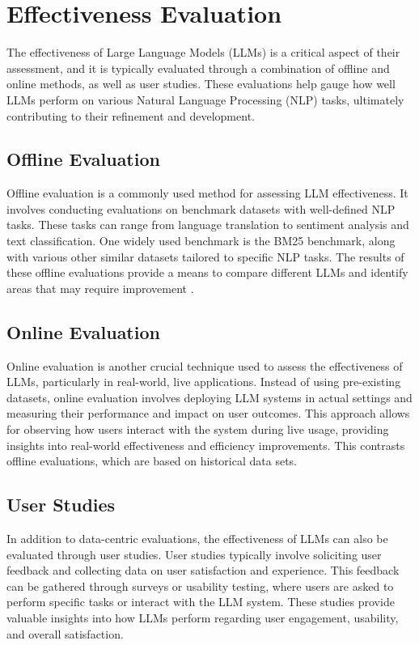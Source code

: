 \section{Effectiveness Evaluation}
The effectiveness of Large Language Models (LLMs) is a critical aspect of their assessment, and it is typically evaluated through a combination of offline and online methods, as well as user studies. These evaluations help gauge how well LLMs perform on various Natural Language Processing (NLP) tasks, ultimately contributing to their refinement and development.

\subsection{Offline Evaluation}
Offline evaluation is a commonly used method for assessing LLM effectiveness. It involves conducting evaluations on benchmark datasets with well-defined NLP tasks. These tasks can range from language translation to sentiment analysis and text classification. One widely used benchmark is the BM25 benchmark, along with various other similar datasets tailored to specific NLP tasks. The results of these offline evaluations provide a means to compare different LLMs and identify areas that may require improvement \cite{penha2022}.

\subsection{Online Evaluation}
Online evaluation is another crucial technique used to assess the effectiveness of LLMs, particularly in real-world, live applications. Instead of using pre-existing datasets, online evaluation involves deploying LLM systems in actual settings and measuring their performance and impact on user outcomes. This approach allows for observing how users interact with the system during live usage, providing insights into real-world effectiveness and efficiency improvements. This contrasts offline evaluations, which are based on historical data sets.

\subsection{User Studies}
In addition to data-centric evaluations, the effectiveness of LLMs can also be evaluated through user studies. User studies typically involve soliciting user feedback and collecting data on user satisfaction and experience. This feedback can be gathered through surveys or usability testing, where users are asked to perform specific tasks or interact with the LLM system. These studies provide valuable insights into how LLMs perform regarding user engagement, usability, and overall satisfaction.

